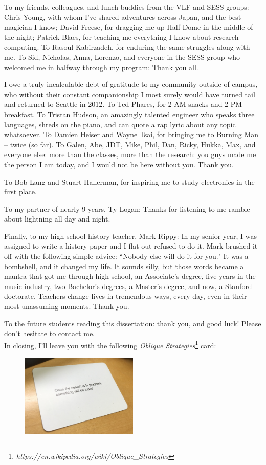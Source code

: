 To my friends, colleagues, and lunch buddies from the VLF and SESS groups: Chris Young, with whom I've shared adventures across Japan, and the best magician I know; David Freese, for dragging me up Half Dome in the middle of the night; Patrick Blaes, for teaching me everything I know about research computing. To Rasoul Kabirzadeh, for enduring the same struggles along with me. To Sid, Nicholas, Anna, Lorenzo, and everyone in the SESS group who welcomed me in halfway through my program: Thank you all.

I owe a truly incalculable debt of gratitude to my community outside of campus, who without their constant companionship I most surely would have turned tail and returned to Seattle in 2012. To Ted Phares, for 2 AM snacks and 2 PM breakfast. To Tristan Hudson, an amazingly talented engineer who speaks three languages, shreds on the piano, and can quote a rap lyric about any topic whatsoever. To Damien Heiser and Wayne Tsai, for bringing me to Burning Man -- twice (so far). To Galen, Abe, JDT, Mike, Phil, Dan, Ricky, Hukka, Max, and everyone else: more than the classes, more than the research: you guys made me the person I am today, and I would not be here without you. Thank you.

To Bob Lang and Stuart Hallerman, for inspiring me to study electronics in the first place.

To my partner of nearly 9 years, Ty Logan: Thanks for listening to me ramble about lightning all day and night.

Finally, to my high school history teacher, Mark Rippy: In my senior year, I was assigned to write a history paper and I flat-out refused to do it. Mark brushed it off with the following simple advice: ``Nobody else will do it for you." It was a bombshell, and it changed my life. It sounds silly, but those words became a mantra that got me through high school, an Associate's degree, five years in the music industry, two Bachelor's degrees, a Master's degree, and now, a Stanford doctorate. Teachers change lives in tremendous ways, every day, even in their most-unassuming moments. Thank you.

To the future students reading this dissertation: thank you, and good luck! Please don't hesitate to contact me. \\

\noindent In closing, I'll leave you with the following \emph{Oblique Strategies}\footnote{\emph{https://en.wikipedia.org/wiki/Oblique\_Strategies}} card:

\begin{figure}[h!]
\centering
\includegraphics[width=0.5\textwidth]{figures/oblique_strategies_cropped.png}
\end{figure}



